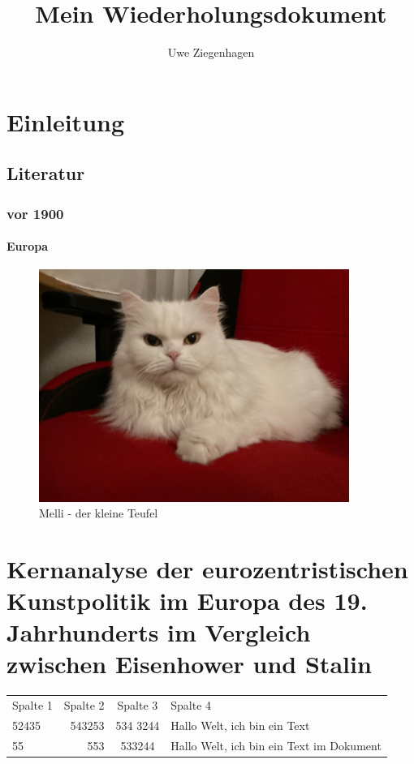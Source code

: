 \documentclass[12pt,ngerman,parkskip=half]{scrreprt}
\title{Mein Wiederholungsdokument}
\author{Uwe Ziegenhagen}
\begin{document}
\maketitle

\tableofcontents

\listoffigures

\chapter{Einleitung}

\section{Literatur}

\subsection{vor 1900}

\subsubsection{Europa}

\blindtext[3]

\begin{figure}[h]
\begin{center}
\includegraphics[width=0.9\textwidth]{Bilder/Katze}
\caption{Melli - der kleine Teufel}\label{fig:Katze}
\end{center}
\end{figure}

\blindtext[3]

\blindtext

\chapter[Kernanalyse der eurozentristischen Kunstpolitik]{Kernanalyse der eurozentristischen Kunstpolitik im Europa des 19. Jahrhunderts im Vergleich zwischen Eisenhower und Stalin}

\begin{table}
\begin{tabular}{lrcp{6cm}}
Spalte 1 & Spalte 2 & Spalte 3 & Spalte 4 \\
52435 & 543253 & 534 3244 & Hallo Welt, ich bin ein Text \\
55 & 553 & 533244 & Hallo Welt, ich bin ein Text im Dokument\\
\end{tabular}

\end{table}
\end{document}
